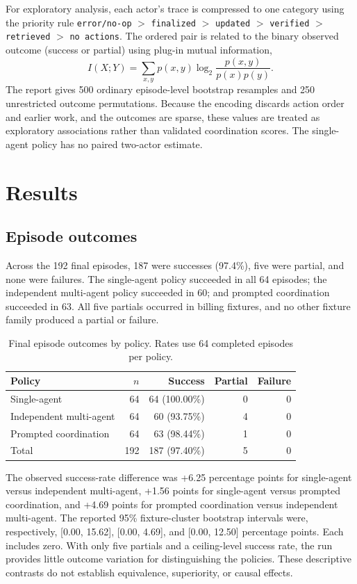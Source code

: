 \documentclass[pdflatex,sn-basic,Numbered]{sn-jnl}
\begin{document}
For exploratory analysis, each actor's trace is compressed to one category using the priority rule \texttt{error/no-op} $>$ \texttt{finalized} $>$ \texttt{updated} $>$ \texttt{verified} $>$ \texttt{retrieved} $>$ \texttt{no actions}. The ordered pair is related to the binary observed outcome (success or partial) using plug-in mutual information,
\[
I(X;Y)=\sum_{x,y}p(x,y)\log_2\frac{p(x,y)}{p(x)p(y)}.
\]
The report gives 500 ordinary episode-level bootstrap resamples and 250 unrestricted outcome permutations. Because the encoding discards action order and earlier work, and the outcomes are sparse, these values are treated as exploratory associations rather than validated coordination scores. The single-agent policy has no paired two-actor estimate.

\section{Results}

\subsection{Episode outcomes}

Across the 192 final episodes, 187 were successes (97.4\%), five were partial, and none were failures. The single-agent policy succeeded in all 64 episodes; the independent multi-agent policy succeeded in 60; and prompted coordination succeeded in 63. All five partials occurred in billing fixtures, and no other fixture family produced a partial or failure.

\begin{table}[t]
\centering
\caption{Final episode outcomes by policy. Rates use 64 completed episodes per policy.}
\label{tab:outcomes}
\begin{tabular}{lrrrr}
\toprule
Policy & $n$ & Success & Partial & Failure \\
\midrule
Single-agent & 64 & 64 (100.00\%) & 0 & 0 \\
Independent multi-agent & 64 & 60 (93.75\%) & 4 & 0 \\
Prompted coordination & 64 & 63 (98.44\%) & 1 & 0 \\
\midrule
Total & 192 & 187 (97.40\%) & 5 & 0 \\
\bottomrule
\end{tabular}
\end{table}

The observed success-rate difference was +6.25 percentage points for single-agent versus independent multi-agent, +1.56 points for single-agent versus prompted coordination, and +4.69 points for prompted coordination versus independent multi-agent. The reported 95\% fixture-cluster bootstrap intervals were, respectively, [0.00, 15.62], [0.00, 4.69], and [0.00, 12.50] percentage points. Each includes zero. With only five partials and a ceiling-level success rate, the run provides little outcome variation for distinguishing the policies. These descriptive contrasts do not establish equivalence, superiority, or causal effects.
\end{document}
